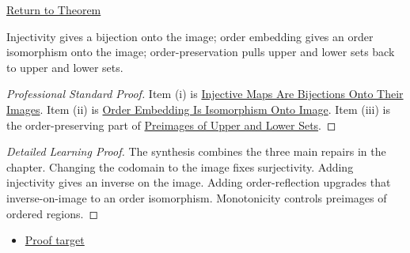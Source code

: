 \newpage
{}
\label{prf:fo-synthesis}

\begin{remark*}[Return]
\hyperref[thm:fo-synthesis]{Return to Theorem}
\end{remark*}

\begin{theorem*}
Injectivity gives a bijection onto the image; order embedding gives an order
isomorphism onto the image; order-preservation pulls upper and lower sets back
to upper and lower sets.
\end{theorem*}

\begin{proof}[Professional Standard Proof]
\LRAProofBodyStart
Item (i) is \hyperref[thm:injective-bijection-onto-image]{Injective Maps Are
Bijections Onto Their Images}. Item (ii) is
\hyperref[thm:order-embedding-isomorphism-onto-image]{Order Embedding Is
Isomorphism Onto Image}. Item (iii) is the order-preserving part of
\hyperref[thm:preimage-upper-lower-sets]{Preimages of Upper and Lower Sets}.
\end{proof}

\begin{proof}[Detailed Learning Proof]
\LRAProofBodyStart
The synthesis combines the three main repairs in the chapter. Changing the
codomain to the image fixes surjectivity. Adding injectivity gives an inverse
on the image. Adding order-reflection upgrades that inverse-on-image to an
order isomorphism. Monotonicity controls preimages of ordered regions.
\end{proof}
\begin{remark*}
\end{remark*}



\begin{dependencies}
\begin{itemize}
  \item \hyperref[thm:fo-synthesis]{Proof target}
\end{itemize}
\end{dependencies}

\clearpage


